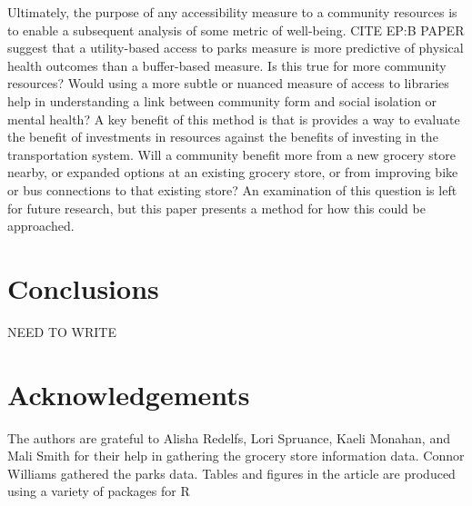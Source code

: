 \documentclass[3p, authoryear]{elsarticle} %
\begin{document}
Ultimately, the purpose of any accessibility measure to a community resources
is to enable a subsequent analysis of some metric of well-being. CITE EP:B PAPER
suggest that a utility-based access to parks measure is more predictive of
physical health outcomes than a buffer-based measure. Is this true for more
community resources? Would using a more subtle or nuanced measure of access to
libraries help in understanding a link between community form and social isolation
or mental health? A key benefit of this method is that is provides a way to
evaluate the benefit of investments in resources against the benefits of investing
in the transportation system. Will a community benefit more from a new grocery store
nearby, or expanded options at an existing grocery store, or from improving bike
or bus connections to that existing store? An examination of this question is
left for future research, but this paper presents a method for how this could be
approached.

\hypertarget{conclusions}{%
\section{Conclusions}\label{conclusions}}

NEED TO WRITE

\hypertarget{acknowledgements}{%
\section*{Acknowledgements}\label{acknowledgements}}

The authors are grateful to Alisha Redelfs, Lori Spruance, Kaeli Monahan, and
Mali Smith for their help in gathering the grocery store information data.
Connor Williams gathered the parks data. Tables and figures in the article are
produced using a variety of packages for R \citep{modelsummary, ggspatial}


\end{document}
